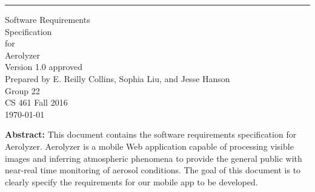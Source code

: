 \documentclass[letterpaper,10pt,draftclsnofoot,onecolumn]{IEEEtran}
\title{\team \assign}
\author{\name}
\def\name{E. Reilly Collins, Sophia Liu, and Jesse Hanson}
\def\team{Aerolyzer}
\def\group{Group 22}
\def\course{CS 461 Fall 2016}
\begin{document}
\begin{flushright}
	\sffamily
	\rule{16cm}{5pt}\vskip1cm
	\begin{bfseries}
		\Huge{Software Requirements\\ Specification}\\
		\vspace{.9cm}
		\LARGE for\\
		\vspace{.9cm}
		\Huge\team\\
		\vspace{.9cm}
		\Large{Version 1.0 approved}\\
		\vspace{.9cm}
		Prepared by \name\\
		\vspace{.9cm}
		\group\\
		\vspace{.9cm}
		\course\\
		\vspace{.9cm}
		\today\\
	\end{bfseries}
\end{flushright}
\vfill
\textbf{Abstract: }This document contains the software requirements specification for Aerolyzer.
Aerolyzer is a mobile Web application capable of processing visible images and inferring atmospheric phenomena to provide the general public with near-real time monitoring of aerosol conditions.
The goal of this document is to clearly specify the requirements for our mobile app to be developed.
\end{document}
